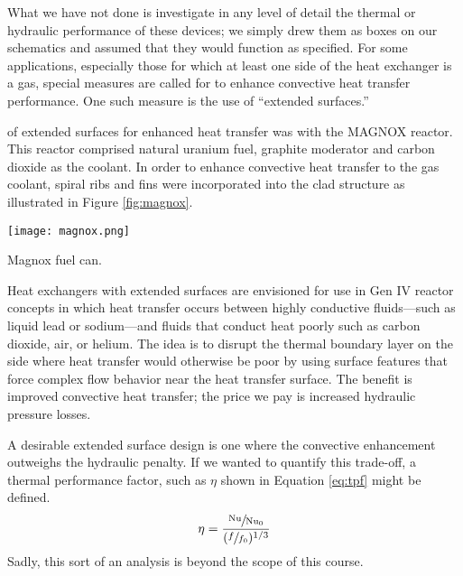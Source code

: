 What we have not done is investigate in any level of detail the thermal or hydraulic performance of these devices; we simply drew them as boxes on our schematics and assumed that they would function as specified. For some applications, especially those for which at least one side of the heat exchanger is a gas, special measures are called for to enhance convective heat transfer performance.  One such measure is the use of ``extended surfaces.''  

 of extended surfaces for enhanced heat transfer was with the MAGNOX reactor. This reactor comprised natural uranium fuel, graphite moderator and carbon dioxide as the coolant.  In order to enhance convective heat transfer to the gas coolant, spiral ribs and fins were incorporated into the clad structure as illustrated in Figure \ref{fig:magnox}.

\begin{marginfigure}
\texttt{[image: magnox.png]}
\caption{Magnox fuel can.}
\label{fig:magnox}
\end{marginfigure}

Heat exchangers with extended surfaces are envisioned for use in Gen IV reactor concepts in which heat transfer occurs between highly conductive fluids---such as liquid lead or sodium---and fluids that conduct heat poorly such as carbon dioxide, air, or helium. The idea is to disrupt the thermal boundary layer on the side where heat transfer would otherwise be poor by using surface features that force complex flow behavior near the heat transfer surface.  The benefit is improved convective heat transfer; the price we pay is increased hydraulic pressure losses.  

A desirable extended surface design is one where the convective enhancement outweighs the hydraulic penalty. If we wanted to quantify this trade-off, a thermal performance factor,\cite{maradiya2018heat} such as $\eta$ shown in Equation \ref{eq:tpf} might be defined.
\begin{equation}
\eta = \frac{\sfrac{\text{Nu}}{\text{Nu}_0}}{(\sfrac{f}{f_0})^{1/3}}
\label{eq:tpf}
\end{equation}
Sadly, this sort of an analysis is beyond the scope of this course.


